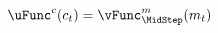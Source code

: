   \begin{equation}\begin{gathered}\begin{aligned}
        \uFunc^{{c}}({c}_{t})  & = \null{\vFunc}^{{m}}_{\MidStep}({m}_{t})\label{eq:Envelope}
      \end{aligned}\end{gathered}\end{equation}
